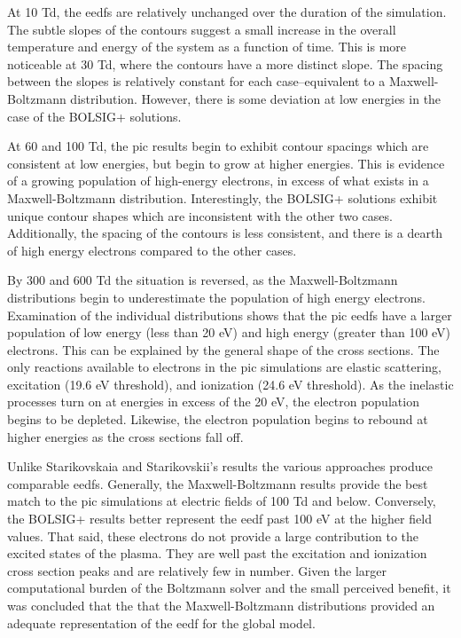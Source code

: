 At 10 Td, the \acs{eedf}s are relatively unchanged over the duration of the
simulation. The subtle slopes of the contours suggest a small increase in the
overall temperature and energy of the system as a function of time. This is more
noticeable at 30 Td, where the contours have a more distinct slope. The spacing
between the slopes is relatively constant for each case--equivalent to a
Maxwell-Boltzmann distribution. However, there is some deviation at low energies
in the case of the BOLSIG+ solutions.

At 60 and 100 Td, the \acs{pic} results begin to exhibit contour spacings which
are consistent at low energies, but begin to grow at higher energies. This is
evidence of a growing population of high-energy electrons, in excess of what
exists in a Maxwell-Boltzmann distribution. Interestingly, the BOLSIG+ solutions
exhibit unique contour shapes which are inconsistent with the other two cases.
Additionally, the spacing of the contours is less consistent, and there is a
dearth of high energy electrons compared to the other cases.

By 300 and 600 Td the situation is reversed, as the Maxwell-Boltzmann
distributions begin to underestimate the population of high energy electrons.
Examination of the individual distributions shows that the \acs{pic} \acs{eedf}s
have a larger population of low energy (less than 20 eV) and high energy
(greater than 100 eV) electrons. This can be explained by the general shape of
the cross sections. The only reactions available to electrons in the \acs{pic}
simulations are elastic scattering, excitation (19.6 eV threshold), and
ionization (24.6 eV threshold). As the inelastic processes turn on at energies
in excess of the 20 eV, the electron population begins to be depleted. Likewise,
the electron population begins to rebound at higher energies as the cross
sections fall off.

Unlike Starikovskaia and Starikovskii's results \cite{Starikovskaia2001} the
various approaches produce comparable \acs{eedf}s. Generally, the
Maxwell-Boltzmann results provide the best match to the \acs{pic} simulations at
electric fields of 100 Td and below. Conversely, the BOLSIG+ results better
represent the \acs{eedf} past 100 eV at the higher field values. That said,
these electrons do not provide a large contribution to the excited states of the
plasma. They are well past the excitation and ionization cross section peaks and
are relatively few in number. Given the larger computational burden of the
Boltzmann solver and the small perceived benefit, it was concluded that the that
the Maxwell-Boltzmann distributions provided an adequate representation of
the \acs{eedf} for the global model.

